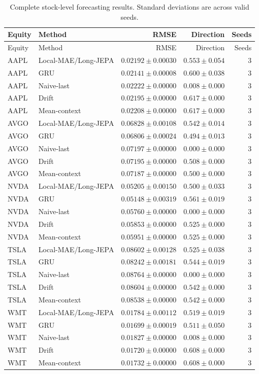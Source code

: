\begin{longtable}{llrrr}
\caption{Complete stock-level forecasting results. Standard deviations are across valid seeds.}\label{tab:appendix_stock_metrics}\\
\toprule
Equity & Method & RMSE & Direction & Seeds \\
\midrule
\endfirsthead
\toprule
Equity & Method & RMSE & Direction & Seeds \\
\midrule
\endhead
AAPL & Local-MAE/Long-JEPA & $0.02192 \pm 0.00030$ & $0.553 \pm 0.054$ & 3 \\
AAPL & GRU & $0.02141 \pm 0.00008$ & $0.600 \pm 0.038$ & 3 \\
AAPL & Naive-last & $0.02222 \pm 0.00000$ & $0.008 \pm 0.000$ & 3 \\
AAPL & Drift & $0.02195 \pm 0.00000$ & $0.617 \pm 0.000$ & 3 \\
AAPL & Mean-context & $0.02208 \pm 0.00000$ & $0.617 \pm 0.000$ & 3 \\
AVGO & Local-MAE/Long-JEPA & $0.06828 \pm 0.00108$ & $0.542 \pm 0.014$ & 3 \\
AVGO & GRU & $0.06806 \pm 0.00024$ & $0.494 \pm 0.013$ & 3 \\
AVGO & Naive-last & $0.07197 \pm 0.00000$ & $0.000 \pm 0.000$ & 3 \\
AVGO & Drift & $0.07195 \pm 0.00000$ & $0.508 \pm 0.000$ & 3 \\
AVGO & Mean-context & $0.07187 \pm 0.00000$ & $0.500 \pm 0.000$ & 3 \\
NVDA & Local-MAE/Long-JEPA & $0.05205 \pm 0.00150$ & $0.500 \pm 0.033$ & 3 \\
NVDA & GRU & $0.05148 \pm 0.00319$ & $0.561 \pm 0.019$ & 3 \\
NVDA & Naive-last & $0.05760 \pm 0.00000$ & $0.000 \pm 0.000$ & 3 \\
NVDA & Drift & $0.05853 \pm 0.00000$ & $0.525 \pm 0.000$ & 3 \\
NVDA & Mean-context & $0.05951 \pm 0.00000$ & $0.525 \pm 0.000$ & 3 \\
TSLA & Local-MAE/Long-JEPA & $0.08602 \pm 0.00128$ & $0.525 \pm 0.038$ & 3 \\
TSLA & GRU & $0.08242 \pm 0.00181$ & $0.544 \pm 0.019$ & 3 \\
TSLA & Naive-last & $0.08764 \pm 0.00000$ & $0.000 \pm 0.000$ & 3 \\
TSLA & Drift & $0.08604 \pm 0.00000$ & $0.542 \pm 0.000$ & 3 \\
TSLA & Mean-context & $0.08538 \pm 0.00000$ & $0.542 \pm 0.000$ & 3 \\
WMT & Local-MAE/Long-JEPA & $0.01784 \pm 0.00112$ & $0.519 \pm 0.019$ & 3 \\
WMT & GRU & $0.01699 \pm 0.00019$ & $0.511 \pm 0.050$ & 3 \\
WMT & Naive-last & $0.01827 \pm 0.00000$ & $0.008 \pm 0.000$ & 3 \\
WMT & Drift & $0.01720 \pm 0.00000$ & $0.608 \pm 0.000$ & 3 \\
WMT & Mean-context & $0.01732 \pm 0.00000$ & $0.608 \pm 0.000$ & 3 \\
\bottomrule
\end{longtable}
